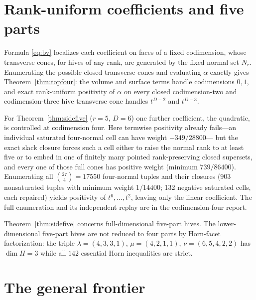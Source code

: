 \documentclass[11pt]{amsart}
\theoremstyle{definition}
\newcommand{\lam}{\lambda}
\begin{document}
\section{Rank-uniform coefficients and five parts}\label{sec:uniform}

Formula \eqref{eq:bv} localizes each coefficient on faces of a fixed codimension,
whose transverse cones, for hives of any rank, are generated by the fixed normal
set $N_r$. Enumerating the possible closed transverse cones and evaluating
$\alpha$ exactly gives Theorem~\ref{thm:topfour}: the volume and surface terms
handle codimensions $0,1$, and exact rank-uniform positivity of $\alpha$ on every
closed codimension-two and codimension-three hive transverse cone handles $t^{D-2}$
and $t^{D-3}$.

For Theorem~\ref{thm:sidefive} ($r=5$, $D=6$) one further coefficient, the
quadratic, is controlled at codimension four. Here termwise positivity already
fails---an individual saturated four-normal cell can have weight $-349/28800$---%
but the exact slack closure forces such a cell either to raise the normal rank to
at least five or to embed in one of finitely many pointed rank-preserving closed
supersets, and every one of those full cones has positive weight (minimum
$739/86400$). Enumerating all $\binom{27}{4}=17550$ four-normal tuples and their
closures (903 nonsaturated tuples with minimum weight $1/14400$; 132 negative
saturated cells, each repaired) yields positivity of $t^{6},\dots,t^{2}$, leaving
only the linear coefficient. The full enumeration and its independent replay are
in the codimension-four report.

Theorem~\ref{thm:sidefive} concerns full-dimensional five-part hives. The
lower-dimensional five-part hives are not reduced to four parts by Horn-facet
factorization: the triple $\lam=(4,3,3,1)$, $\mu=(4,2,1,1)$, $\nu=(6,5,4,2,2)$
has $\dim H=3$ while all $142$ essential Horn inequalities are strict.

\section{The general frontier}\label{sec:frontier}
\end{document}
